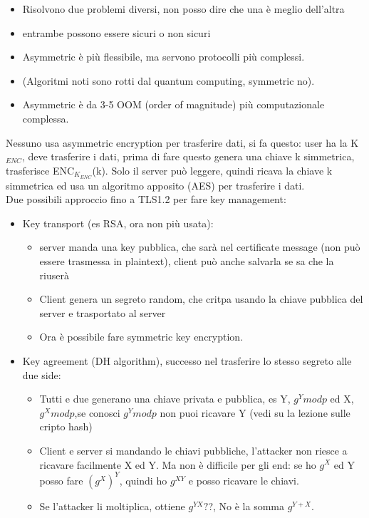 \documentclass[16px]{article}
\begin{document}
\begin{itemize}
\item Risolvono due problemi diversi, non posso dire che una è meglio dell'altra
\item entrambe possono essere sicuri o non sicuri
\item Asymmetric è più flessibile, ma servono protocolli più complessi.
\item (Algoritmi noti sono rotti dal quantum computing, symmetric no).
\item Asymmetric è da 3-5 OOM (order of magnitude) più computazionale complessa.
\end{itemize}
Nessuno usa asymmetric encryption per trasferire dati, si fa questo: user ha la K$_{ENC}$, deve trasferire i dati, prima di fare questo genera una chiave k simmetrica, trasferisce ENC$_{K_{ENC}}$(k).  Solo il server può leggere, quindi ricava la chiave k simmetrica ed usa un algoritmo apposito (AES) per trasferire i dati.\\ Due possibili approccio fino a TLS1.2 per fare key management:
\begin{itemize}
\item Key transport (es RSA, ora non più usata): 
\begin{itemize}
\item server manda una key pubblica, che sarà nel certificate message (non può essere trasmessa in plaintext), client può anche salvarla se sa che la riuserà
\item Client genera un segreto random, che critpa usando la chiave pubblica del server e trasportato al server
\item Ora è possibile fare symmetric key encryption.
\end{itemize}
\item Key agreement (DH algorithm), successo nel trasferire lo stesso segreto alle due side:
\begin{itemize}
\item Tutti e due generano una chiave privata e pubblica, es Y, $g^{Y}modp$ ed  X, $g^{X}modp$,se conosci $g^{Y}modp$ non puoi ricavare Y (vedi su la lezione sulle cripto hash)
\item Client e server si mandando le chiavi pubbliche, l'attacker non riesce a ricavare facilmente X ed Y. Ma non è difficile per gli end: se ho $g^{X}$ ed Y posso fare $(g^{X})^{Y}$, quindi ho $g^{XY}$ e posso ricavare le chiavi.
\item Se l'attacker li moltiplica, ottiene $g^{YX}?$?, No è la somma $g^{Y+X}$.
\end{itemize} 
\end{itemize}
\end{document}
